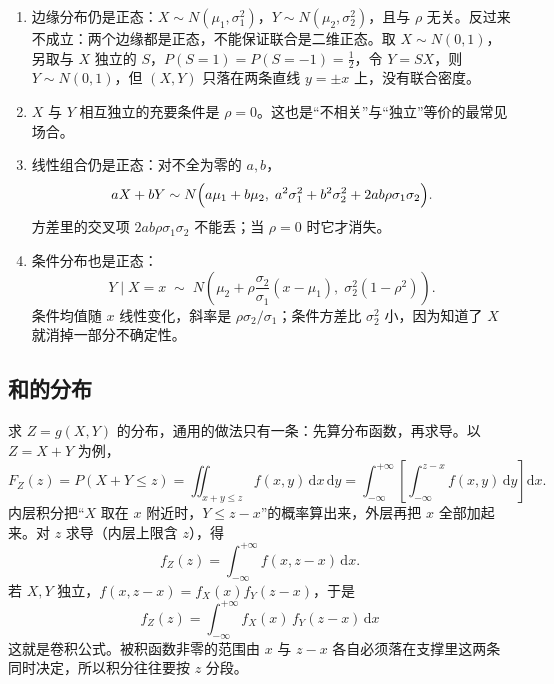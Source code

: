 \begin{enumerate}[label=(\arabic*),leftmargin=2.2em]
\item 边缘分布仍是正态：$X\sim N(\mu_1,\sigma_1^2)$，$Y\sim N(\mu_2,\sigma_2^2)$，且与 $\rho$ 无关。反过来不成立：两个边缘都是正态，不能保证联合是二维正态。取 $X\sim N(0,1)$，另取与 $X$ 独立的 $S$，$P(S=1)=P(S=-1)=\frac12$，令 $Y=SX$，则 $Y\sim N(0,1)$，但 $(X,Y)$ 只落在两条直线 $y=\pm x$ 上，没有联合密度。
\item $X$ 与 $Y$ 相互独立的充要条件是 $\rho=0$。这也是“不相关”与“独立”等价的最常见场合。
\item 线性组合仍是正态：对不全为零的 $a,b$，
\[
aX+bY\sim N\Bigl(a\mu_1+b\mu_2,\; a^2\sigma_1^2+b^2\sigma_2^2+2ab\rho\sigma_1\sigma_2\Bigr).
\]
方差里的交叉项 $2ab\rho\sigma_1\sigma_2$ 不能丢；当 $\rho=0$ 时它才消失。
\item 条件分布也是正态：
\[
Y\mid X=x\;\sim\; N\!\left(\mu_2+\rho\frac{\sigma_2}{\sigma_1}(x-\mu_1),\;\sigma_2^2(1-\rho^2)\right).
\]
条件均值随 $x$ 线性变化，斜率是 $\rho\sigma_2/\sigma_1$；条件方差比 $\sigma_2^2$ 小，因为知道了 $X$ 就消掉一部分不确定性。
\end{enumerate}

\subsection{和的分布}

求 $Z=g(X,Y)$ 的分布，通用的做法只有一条：先算分布函数，再求导。以 $Z=X+Y$ 为例，
\[
F_Z(z)=P(X+Y\le z)=\iint_{x+y\le z}f(x,y)\,\mathrm dx\,\mathrm dy
=\int_{-\infty}^{+\infty}\!\!\left[\int_{-\infty}^{z-x}f(x,y)\,\mathrm dy\right]\mathrm dx .
\]
内层积分把“$X$ 取在 $x$ 附近时，$Y\le z-x$”的概率算出来，外层再把 $x$ 全部加起来。对 $z$ 求导（内层上限含 $z$），得
\[
f_Z(z)=\int_{-\infty}^{+\infty}f(x,z-x)\,\mathrm dx .
\]
若 $X,Y$ 独立，$f(x,z-x)=f_X(x)f_Y(z-x)$，于是
\[
\boxed{\;f_Z(z)=\int_{-\infty}^{+\infty}f_X(x)\,f_Y(z-x)\,\mathrm dx\;}
\]
这就是卷积公式。被积函数非零的范围由 $x$ 与 $z-x$ 各自必须落在支撑里这两条同时决定，所以积分往往要按 $z$ 分段。

